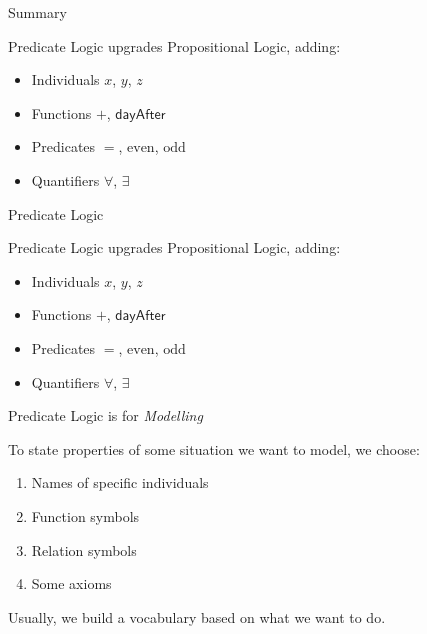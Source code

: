 \documentclass[xetex,aspectratio=169,14pt,hyperref={pdfpagelabels=true,pdflang={en-GB}}]{beamer}
\begin{document}
\begin{frame}
  {Summary}

  Predicate Logic upgrades Propositional Logic, adding:
  \begin{itemize}
  \item Individuals $x$, $y$, $z$
  \item Functions $+$, $\mathsf{dayAfter}$
  \item Predicates $=$, $\mathrm{even}$, $\mathrm{odd}$
  \item Quantifiers $\forall$, $\exists$
  \end{itemize}
\end{frame}


\begin{frame}
  {Predicate Logic}

  Predicate Logic upgrades Propositional Logic, adding:
  \begin{itemize}
  \item Individuals $x$, $y$, $z$
  \item Functions $+$, $\mathsf{dayAfter}$
  \item Predicates $=$, $\mathrm{even}$, $\mathrm{odd}$
  \item Quantifiers $\forall$, $\exists$
  \end{itemize}
\end{frame}

\begin{frame}
  {Predicate Logic is for \emph{Modelling}}

  \bigskip

  To state properties of some situation we want to model, we choose:
  \begin{enumerate}
  \item Names of specific individuals \\
  \item Function symbols \\
  \item Relation symbols \\
  \item Some axioms \\
  \end{enumerate}

  \bigskip

  Usually, we build a vocabulary based on what we want to do.
\end{frame}
\end{document}
